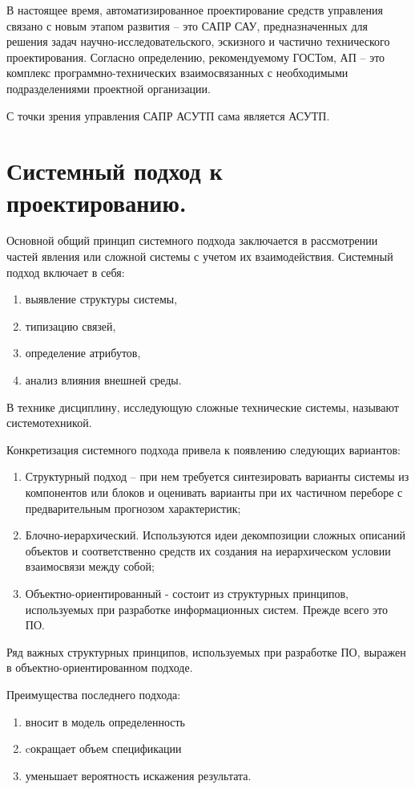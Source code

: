 \documentclass[unicode, 12pt, a4paper, oneside]{article}
\begin{document}
В настоящее время, автоматизированное проектирование средств управления связано с новым этапом развития – это САПР САУ, предназначенных для решения задач научно-исследовательского, эскизного и частично технического проектирования. Согласно определению, рекомендуемому ГОСТом, АП – это комплекс программно-технических взаимосвязанных с необходимыми подразделениями проектной организации.

С точки зрения управления САПР АСУТП сама является АСУТП.

\section{Системный подход к проектированию.}

Основной общий принцип системного подхода заключается в рассмотрении частей явления или сложной системы с учетом их взаимодействия.	Системный подход включает в себя:
\begin{enumerate}
\item выявление структуры системы,
\item типизацию связей,
\item определение атрибутов,
\item анализ влияния внешней среды.
\end{enumerate}

В технике дисциплину, исследующую сложные технические системы, называют системотехникой.

Конкретизация системного подхода привела к появлению следующих вариантов:
\begin{enumerate}
\item Структурный подход – при нем требуется синтезировать варианты системы из компонентов или блоков и оценивать варианты при их частичном 
переборе с предварительным прогнозом характеристик;
\item Блочно-иерархический. Используются идеи декомпозиции сложных описаний объектов и соответственно средств их создания на иерархическом условии взаимосвязи между собой;
\item Объектно-ориентированный - состоит из структурных принципов, используемых при разработке информационных систем. Прежде всего это ПО.
\end{enumerate}

Ряд важных структурных принципов, используемых при разработке ПО, выражен в объектно-ориентированном подходе.
  
Преимущества последнего подхода:
\begin{enumerate}
\item вносит в модель определенность
\item cокращает объем спецификации
\item уменьшает вероятность искажения результата.
\end{enumerate}
\end{document}
